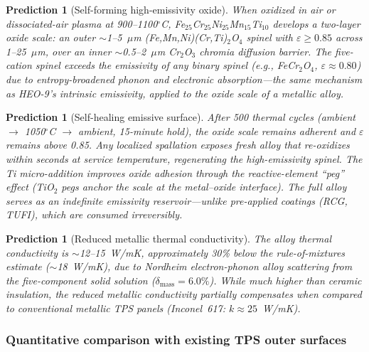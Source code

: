 \documentclass[12pt,letterpaper]{article}
\newtheorem{prediction}[theorem]{Prediction}
\theoremstyle{definition}
\begin{document}
\begin{prediction}[Self-forming high-emissivity oxide]\label{pred:tps_emissivity}
When oxidized in air or dissociated-air plasma at 900--1100$^\circ$C, Fe$_{25}$Cr$_{25}$Ni$_{25}$Mn$_{15}$Ti$_{10}$ develops a two-layer oxide scale: an outer $\sim$1--5~$\mu$m (Fe,Mn,Ni)(Cr,Ti)$_2$O$_4$ spinel with $\varepsilon \geq 0.85$ across 1--25~$\mu$m, over an inner $\sim$0.5--2~$\mu$m Cr$_2$O$_3$ chromia diffusion barrier.  The five-cation spinel exceeds the emissivity of any binary spinel (e.g., FeCr$_2$O$_4$, $\varepsilon \approx 0.80$) due to entropy-broadened phonon and electronic absorption---the same mechanism as HEO-9's intrinsic emissivity, applied to the oxide scale of a metallic alloy.
\end{prediction}

\begin{prediction}[Self-healing emissive surface]\label{pred:tps_heal}
After 500 thermal cycles (ambient $\to$ 1050$^\circ$C $\to$ ambient, 15-minute hold), the oxide scale remains adherent and $\varepsilon$ remains above 0.85.  Any localized spallation exposes fresh alloy that re-oxidizes within seconds at service temperature, regenerating the high-emissivity spinel.  The Ti micro-addition improves oxide adhesion through the reactive-element ``peg'' effect (TiO$_2$ pegs anchor the scale at the metal--oxide interface).  The full alloy serves as an indefinite emissivity reservoir---unlike pre-applied coatings (RCG, TUFI), which are consumed irreversibly.
\end{prediction}

\begin{prediction}[Reduced metallic thermal conductivity]\label{pred:tps_conductivity}
The alloy thermal conductivity is $\sim$12--15~W/mK, approximately 30\% below the rule-of-mixtures estimate ($\sim$18~W/mK), due to Nordheim electron-phonon alloy scattering from the five-component solid solution ($\delta_{\mathrm{mass}} = 6.0\%$).  While much higher than ceramic insulation, the reduced metallic conductivity partially compensates when compared to conventional metallic TPS panels (Inconel~617: $k \approx 25$~W/mK).
\end{prediction}

\subsubsection{Quantitative comparison with existing TPS outer surfaces}
\end{document}

